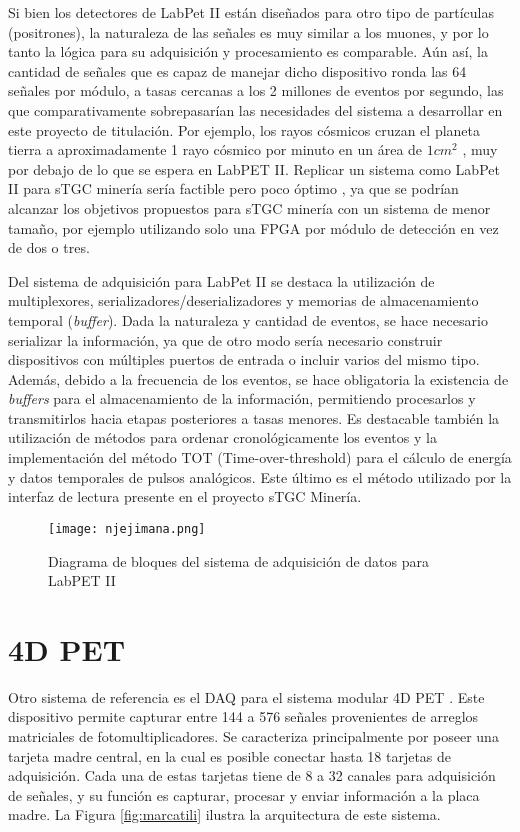	Si bien los detectores de LabPet II están diseñados para otro tipo de partículas (positrones), la naturaleza de las señales es muy similar a los muones, y por lo tanto la lógica para su adquisición y procesamiento es comparable. Aún así, la cantidad de señales que es capaz de manejar dicho dispositivo ronda las 64 señales por módulo, a tasas cercanas a los 2 millones de eventos por segundo, las que comparativamente sobrepasarían las necesidades del sistema a desarrollar en este proyecto de titulación. Por ejemplo, los rayos cósmicos cruzan el planeta tierra a aproximadamente 1 rayo cósmico por minuto en un área de $1cm^2$ , muy por debajo de lo que se espera en LabPET II. Replicar un sistema como LabPet II para sTGC minería sería factible pero poco óptimo , ya que se podrían alcanzar los objetivos propuestos para sTGC minería con un sistema de menor tamaño, por ejemplo utilizando solo una FPGA por módulo de detección en vez de dos o tres.
	
	Del sistema de adquisición para LabPet II se destaca la utilización de multiplexores, serializadores/deserializadores y memorias de almacenamiento temporal (\textit{buffer}). Dada la naturaleza y cantidad de eventos, se hace necesario serializar la información, ya que de otro modo sería necesario construir dispositivos con múltiples puertos de entrada o incluir varios del mismo tipo. Además, debido a la frecuencia de los eventos, se hace obligatoria la existencia de \textit{buffers} para el almacenamiento de la información, permitiendo procesarlos y transmitirlos hacia etapas posteriores a tasas menores. Es destacable también la utilización de métodos para ordenar cronológicamente los eventos y la implementación del método TOT (Time-over-threshold)\cite{Orita2018TheSystem} para el cálculo de energía y datos temporales de pulsos analógicos. Este último es el método utilizado por la interfaz de lectura presente en el proyecto sTGC Minería.
	
	\begin{figure}[h]
		\centering
		\texttt{[image: njejimana.png]}
		\caption{Diagrama de bloques del sistema de adquisición de datos para LabPET II \cite{Njejimana2013DesignImaging}}
		\label{fig:njejimana}
	\end{figure}
	
\newpage
\section{4D PET}
\label{par:4dpet}
	Otro sistema de referencia es el DAQ para el sistema modular 4D PET \cite{Marcatili2011DevelopmentDetector}. Este dispositivo permite capturar entre 144 a 576 señales provenientes de arreglos matriciales de fotomultiplicadores. Se caracteriza principalmente por poseer una tarjeta madre central, en la cual es posible conectar hasta 18 tarjetas de adquisición. Cada una de estas tarjetas tiene de 8 a 32 canales para adquisición de señales, y su función es capturar, procesar y enviar información a la placa madre. La Figura \ref{fig:marcatili} ilustra la arquitectura de este sistema.
		
